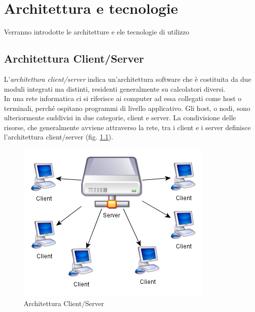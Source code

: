 
\chapter{Architettura e tecnologie}
\label{ref:architettura}

Verranno introdotte le architetture e ele tecnologie di utilizzo

\section{Architettura Client/Server}
L'\emph{architettura client/server} indica un'architettura software che è costituita da due moduli integrati ma distinti, residenti generalmente su calcolatori diversi.\\
In una rete informatica ci si riferisce ai computer ad essa collegati come host o terminali, perché ospitano programmi di livello applicativo. 
Gli host, o nodi, sono ulteriormente suddivisi in due categorie, client e server. La condivisione delle risorse, che generalmente avviene attraverso la rete, tra i client e i server definisce l'architettura client/server (fig. \ref{clientserver}).

\begin{figure}[h]
\begin{center}
\includegraphics[scale=0.75]{imgs/clientserver.png} 
\caption{Architettura Client/Server\label{clientserver}}
\end{center}
\end{figure}

